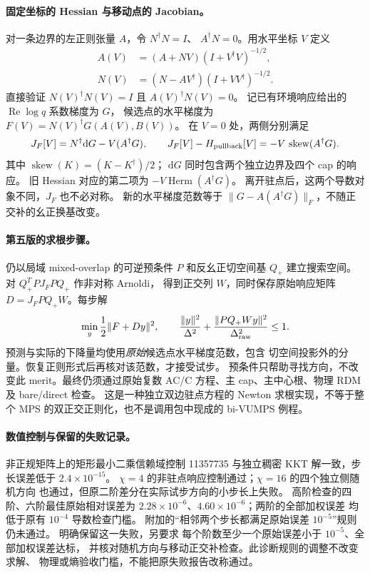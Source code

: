 \paragraph{固定坐标的 Hessian 与移动点的 Jacobian。}
对一条边界的左正则张量 $A$，令 $N^\dagger N=I$、
$A^\dagger N=0$。用水平坐标 $V$ 定义
\begin{align}
 A(V)&=(A+NV)(I+V^\dagger V)^{-1/2},\\
 N(V)&=(N-AV^\dagger)(I+VV^\dagger)^{-1/2}.
\end{align}
直接验证 $N(V)^\dagger N(V)=I$ 且 $A(V)^\dagger N(V)=0$。
记已有环境响应给出的 $\operatorname{Re}\log q$ 系数梯度为 $G$，
候选点的水平梯度为 $F(V)=N(V)^\dagger G(A(V),B(V))$。
在 $V=0$ 处，两侧分别满足
\begin{equation}
 J_F[V]=N^\dagger\mathrm dG-V(A^\dagger G),\qquad
 J_F[V]-H_{\rm pullback}[V]
 =-V\,\operatorname{skew}(A^\dagger G).
\end{equation}
其中 $\operatorname{skew}(K)=(K-K^\dagger)/2$；
$\mathrm dG$ 同时包含两个独立边界及四个 cap 的响应。
旧 Hessian 对应的第二项为 $-V\operatorname{Herm}(A^\dagger G)$。
离开驻点后，这两个导数对象不同，$J_F$ 也不必对称。
新的水平梯度范数等于
$\|G-A(A^\dagger G)\|_F$，不随正交补的幺正换基改变。

\paragraph{第五版的求根步骤。}
仍以局域 mixed-overlap 的可逆预条件 $P$ 和反幺正切空间基
$Q_+$ 建立搜索空间。对 $Q_+^T P J_F P Q_+$ 作非对称 Arnoldi，
得到正交列 $W$，同时保存原始响应矩阵
$D=J_F P Q_+W$。每步解
\begin{equation}
 \min_y\frac12\|F+Dy\|^2,\qquad
 \frac{\|y\|^2}{\Delta^2}
 +\frac{\|P Q_+W y\|^2}{\Delta_{\rm raw}^2}\leq1.
\end{equation}
预测与实际的下降量均使用\emph{原始}候选点水平梯度范数，包含
切空间投影外的分量。恢复正则形式后再核对该范数，才接受试步。
预条件只帮助寻找方向，不改变此 merit。最终仍须通过原始复数
AC/C 方程、主 cap、主中心根、物理 RDM 及 bare/direct 检查。
这是一种独立双边驻点方程的 Newton 求根实现，不等于整个 MPS
的双正交正则化，也不是调用包中现成的 bi-VUMPS 例程。

\paragraph{数值控制与保留的失败记录。}
非正规矩阵上的矩形最小二乘信赖域控制 11357735 与独立稠密 KKT
解一致，步长误差低于 $2.4\times10^{-15}$。
$\chi=4$ 的非驻点响应控制通过；$\chi=16$ 的四个独立侧随机方向
也通过，但原二阶差分在实际试步方向的小步长上失败。
高阶检查的四阶、六阶最佳原始相对误差为
$2.28\times10^{-6}$、$4.60\times10^{-6}$；两阶的全部加权误差
均低于原有 $10^{-4}$ 导数检查门槛。
附加的``相邻两个步长都满足原始误差 $10^{-5}$''规则仍未通过。
 明确保留这一失败，另要求
每个阶数至少一个原始误差小于 $10^{-5}$、全部加权误差达标，
并核对随机方向与移动正交补检查。此诊断规则的调整不改变求解、
物理或熵验收门槛，不能把原失败报告改称通过。

